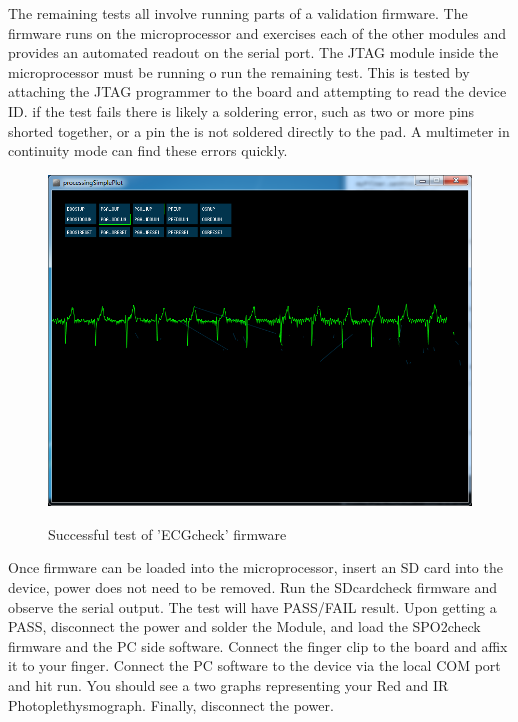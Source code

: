 The remaining tests all involve running parts of a validation firmware. The firmware runs on the microprocessor and exercises each of the other modules and provides an automated readout on the serial port. The JTAG module inside the microprocessor must be running o run the remaining test. This is tested by attaching the JTAG programmer to the board and attempting to read the device ID. if the test fails there is likely a soldering error, such as two or more pins shorted together, or a pin the is not soldered directly to the pad. A multimeter in continuity mode can find these errors quickly. 

\begin{figure}[h]
\begin{center}
	\label{fig:ECG_Test_Pass}
	\includegraphics[angle=0,scale=1,width=1\textwidth]{Images/ECG_processingSketch.png} 
	\caption{Successful test of 'ECGcheck' firmware}
\end{center}
\end{figure}

Once firmware can be loaded into the microprocessor, insert an SD card into the device, power does not need to be removed. Run the SDcardcheck firmware and observe the serial output. The test will have PASS/FAIL result. Upon getting a PASS, disconnect the power and solder the  Module, and load the SPO2check firmware and the PC side software. Connect the finger clip to the board and affix it to your finger. Connect the PC software to the device via the local COM port and hit run. You should see a two graphs representing your Red and IR Photoplethysmograph. Finally, disconnect the power.

